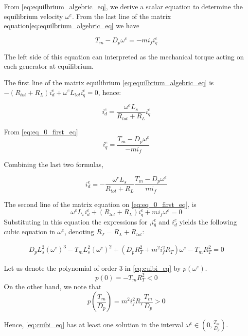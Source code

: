 \documentclass[letterpaper, 10 pt, conference]{ieeeconf}  %
\begin{document}
From \eqref{eq:equilbrium_algebric_eq}, we derive a scalar
equation to determine the equilibrium velocity $\omega^{e}$.
From the last line of the matrix equation\eqref{eq:equilbrium_algebric_eq} we have

\begin{equation}
T_{m}-D_{p}\omega^{e}=-mi_{f}i_{q}^{e}\label{eq:eq_0_first_eq}
\end{equation}

The left side of this equation can interpreted as the  mechanical torque acting on each
generator at equilibrium.

The first line of the matrix equilibrium \eqref{eq:equilbrium_algebric_eq}
is $-\left(R_{tot}+R_{L}\right)i_{d}^{e}+\omega^{e}L_{tot}i_{q}^{e}=0$,
hence:

\[
i_{d}^{e}=\frac{\omega^{e}L_{s}}{R_{tot}+R_{L}}i_{q}^{e}
\]

From \eqref{eq:eq_0_first_eq} 
\begin{equation}
i_{q}^{e}=\frac{T_{m}-D_{p}\omega^{e}}{-mi_{f}}\label{eq:iq_0_}
\end{equation}

Combining the last two formulas,

\begin{equation}
i_{d}^{e}=-\frac{\omega^{e}L_{s}}{R_{tot}+R_{L}}\frac{T_{m}-D_{p}\omega^{e}}{mi_{f}}\label{eq:id_0_}
\end{equation}

The second line of the matrix equation on \eqref{eq:eq_0_first_eq},
is 
$$\omega^{e}L_{s}i_{d}^{e}+\left(R_{tot}+R_{L}\right)i_{q}^{e}+mi_{f}\omega^{e}=0$$
Substituting in this equation the expressions for ,$i_{q}^{e}$ and $i_{d}^{e}$ yields the following cubic equation in $\omega^e$, denoting $R_T = R_L+R_{tot}$:

\begin{equation}
\begin{split}
D_{p}L_{s}^{2}\left(\omega^{e}\right)^{3}-T_{m}L_{s}^{2}\left(\omega^{e}\right)^{2} +\left(D_{p}R_T^{2}+m^{2}i_{f}^{2}R_T\right) \omega^{e}  -T_{m}R_T^{2}=0
\end{split}\label{eq:cuibi_eq}
\end{equation}

Let us denote the polynomial of order 3 in \eqref{eq:cuibi_eq} by
$p(\omega^{e})$. 
$$p(0)=-T_{m}R_T^{2}<0$$
On the other hand, we note that 
$$
p(\frac{T_{m}}{D_{p}}) =m^{2}i_{f}^{2}R_T\frac{T_{m}}{D_{p}}>0
$$

Hence, \eqref{eq:cuibi_eq} has at least one solution in the interval
$\omega^{e}\in\left(0,\frac{T_{m}}{D_{p}}\right)$.
\end{document}

